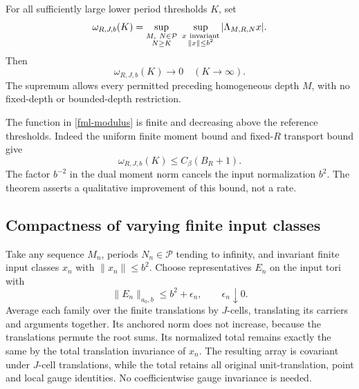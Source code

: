 \begin{theorem}
\label{fml-theorem}
For all sufficiently large lower period thresholds \(K\), set
\begin{equation}
 \omega_{R,J,b}(K)
   =\sup_{\substack{M,\ N\in\mathcal P\\N\ge K}}
      \ \sup_{\substack{x\ {\rm invariant}\\\|x\|\le b^2}}
                     |\Lambda_{M,R,N}x|.
 \label{fml-modulus}
\end{equation}
Then
\begin{equation}
                         \omega_{R,J,b}(K)\longrightarrow0
                         \quad(K\longrightarrow\infty).
 \label{fml-vanishing}
\end{equation}
The supremum allows every permitted preceding homogeneous
depth \(M\), with no fixed-depth or bounded-depth restriction.
\end{theorem}

The function in \eqref{fml-modulus} is finite and decreasing
above the reference thresholds. Indeed the uniform finite
moment bound and fixed-\(R\) transport bound give
\begin{equation}
 \omega_{R,J,b}(K)\le C_\beta(B_R+1).
 \label{fml-crude-bound}
\end{equation}
The factor \(b^{-2}\) in the dual moment norm cancels the
input normalization \(b^2\). The theorem asserts a
qualitative improvement of this bound, not a rate.

\subsection{Compactness of varying finite input classes}
\label{fml-input-compactness}

Take any sequence \(M_n\), periods \(N_n\in\mathcal P\)
tending to infinity, and invariant finite input classes
\(x_n\) with \(\|x_n\|\le b^2\). Choose representatives
\(E_n\) on the input tori with
\begin{equation}
                         \|E_n\|_{a_0,b}\le b^2+\epsilon_n,
                         \qquad \epsilon_n\downarrow0.
 \label{fml-near-minimal}
\end{equation}
Average each family over the finite translations by
\(J\)-cells, translating its carriers and arguments
together. Its anchored norm does not increase, because
the translations permute the root sums. Its normalized
total remains exactly the same by the total translation
invariance of \(x_n\). The resulting array is covariant
under \(J\)-cell translations, while the total retains
all original unit-translation, point and local gauge
identities. No coefficientwise gauge invariance is needed.

